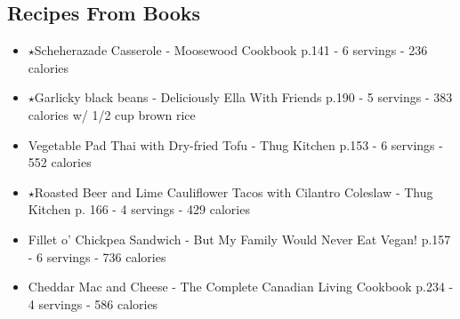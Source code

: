 \subsection*{Recipes From Books}
\begin{itemize}
    \item $\star$Scheherazade Casserole - Moosewood Cookbook p.141 - 6 servings - 236 calories
    \item $\star$Garlicky black beans - Deliciously Ella With Friends p.190 - 5 servings - 383 calories w/ 1/2 cup brown rice
    \item Vegetable Pad Thai with Dry-fried Tofu - Thug Kitchen p.153 - 6 servings - 552 calories
    \item $\star$Roasted Beer and Lime Cauliflower Tacos with Cilantro Coleslaw - Thug Kitchen p. 166 - 4 servings - 429 calories
    \item Fillet o' Chickpea Sandwich - But My Family Would Never Eat Vegan! p.157 - 6 servings - 736 calories
    \item Cheddar Mac and Cheese - The Complete Canadian Living Cookbook p.234 - 4 servings - 586 calories
\end{itemize}